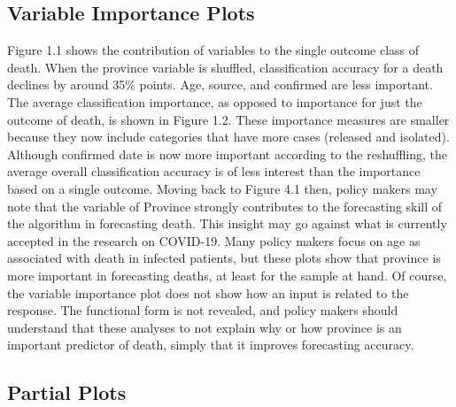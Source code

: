 \documentclass[
]{article}
\begin{document}
\hypertarget{variable-importance-plots}{%
\subsection{Variable Importance Plots}\label{variable-importance-plots}}

Figure 1.1 shows the contribution of variables to the single outcome
class of death. When the province variable is shuffled, classification
accuracy for a death declines by around 35\% points. Age, source, and
confirmed are less important. The average classification importance, as
opposed to importance for just the outcome of death, is shown in Figure
1.2. These importance measures are smaller because they now include
categories that have more cases (released and isolated). Although
confirmed date is now more important according to the reshuffling, the
average overall classification accuracy is of less interest than the
importance based on a single outcome. Moving back to Figure 4.1 then,
policy makers may note that the variable of Province strongly
contributes to the forecasting skill of the algorithm in forecasting
death. This insight may go against what is currently accepted in the
research on COVID-19. Many policy makers focus on age as associated with
death in infected patients, but these plots show that province is more
important in forecasting deaths, at least for the sample at hand. Of
course, the variable importance plot does not show how an input is
related to the response. The functional form is not revealed, and policy
makers should understand that these analyses to not explain why or how
province is an important predictor of death, simply that it improves
forecasting accuracy.

\hypertarget{partial-plots}{%
\subsection{Partial Plots}\label{partial-plots}}
\end{document}

